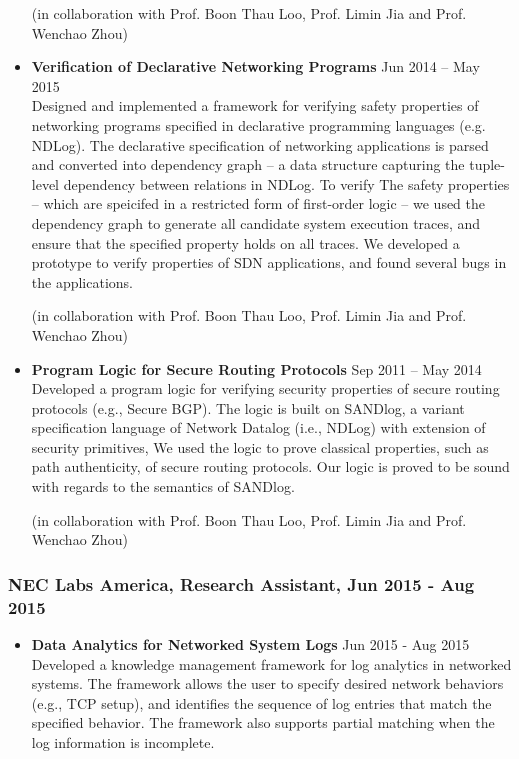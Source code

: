 \documentclass[10pt]{res} %
\begin{document}
\begin{resume}
\begin{itemize}
(in collaboration with Prof. Boon Thau Loo, Prof. Limin Jia and Prof. Wenchao Zhou)
\item {\bf Verification of Declarative Networking Programs} \hfill Jun
  2014 -- May 2015\\ Designed and implemented a framework for
  verifying safety properties of networking programs specified in
  declarative programming languages (e.g. NDLog). The declarative
  specification of networking applications is parsed and converted
  into dependency graph -- a data structure capturing the tuple-level
  dependency between relations in NDLog. To verify The safety
  properties -- which are speicifed in a restricted form of
  first-order logic -- we used the dependency graph to generate all
  candidate system execution traces, and ensure that the specified
  property holds on all traces. We developed a prototype to verify
  properties of SDN applications, and found several bugs in the
  applications.


(in collaboration with Prof. Boon Thau Loo, Prof. Limin Jia and Prof. Wenchao Zhou)
\item {\bf Program Logic for Secure Routing Protocols} \hfill Sep 2011
  -- May 2014\\ Developed a program logic for verifying security
  properties of secure routing protocols (e.g., Secure BGP). The logic
  is built on SANDlog, a variant specification language of Network
  Datalog (i.e., NDLog) with extension of security primitives, We used
  the logic to prove classical properties, such as path authenticity,
  of secure routing protocols. Our logic is proved to be sound with
  regards to the semantics of SANDlog.


(in collaboration with Prof. Boon Thau Loo, Prof. Limin Jia and Prof. Wenchao Zhou)
\end{itemize}

\subsubsection{NEC Labs America, Research Assistant, Jun 2015 - Aug 2015}
\begin{itemize}
\item {\bf Data Analytics for Networked System Logs} \hfill Jun 2015 - Aug 2015\\
Developed a knowledge management framework for log analytics in networked
systems. The framework allows the user to specify desired network behaviors
(e.g., TCP setup), and identifies the sequence of log entries that match the
specified behavior. The framework also supports partial matching when the log
information is incomplete.


\end{itemize}
\end{resume}
\end{document}
